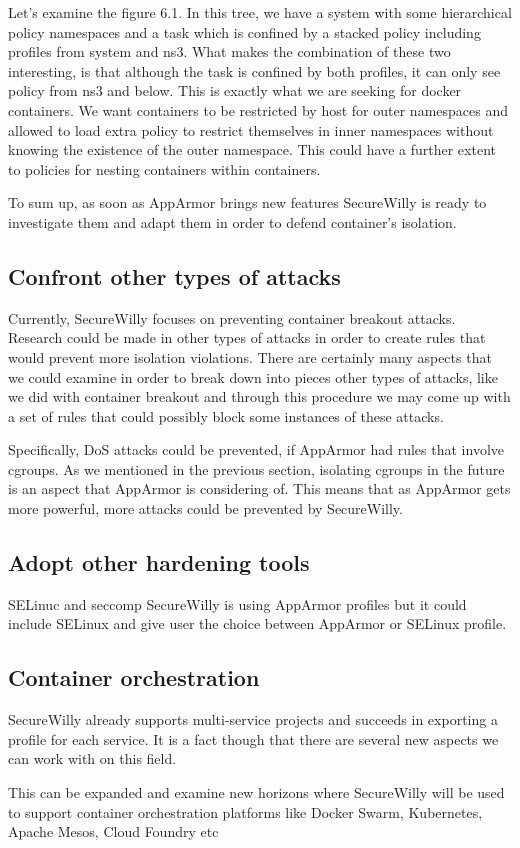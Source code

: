 Let's examine the figure 6.1. In this tree, we have a system with some hierarchical policy namespaces and a task which is confined by a stacked policy including profiles from system and ns3. What makes the combination of these two interesting, is that although the task is confined by both profiles, it can only see policy from ns3 and below. This is exactly what we are seeking for docker containers. We want containers to be restricted by host for outer namespaces and allowed to load extra policy to restrict themselves in inner namespaces without knowing the existence of the outer namespace.
This could have a further extent to policies for nesting containers within containers.

To sum up, as soon as AppArmor brings new features SecureWilly is ready to investigate them and adapt them in order to defend container's isolation.

\subsection{Confront other types of attacks}
Currently, SecureWilly focuses on preventing container breakout attacks. Research could be made in other types of attacks in order to create rules that would prevent more isolation violations. There are certainly many aspects that we could examine in order to break down into pieces other types of attacks, like we did with container breakout and through this procedure we may come up with a set of rules that could possibly block some instances of these attacks.

Specifically, DoS attacks could be prevented, if AppArmor had rules that involve cgroups. As we mentioned in the previous section, isolating cgroups in the future is an aspect that AppArmor is considering of. This means that as AppArmor gets more powerful, more attacks could be prevented by SecureWilly.

\subsection{Adopt other hardening tools}
SELinuc and seccomp
SecureWilly is using AppArmor profiles but it could include SELinux and give user the choice between AppArmor or SELinux profile.

\subsection{Container orchestration}
SecureWilly already supports multi-service projects and succeeds in exporting a profile for each service. It is a fact though that there are several new aspects we can work with on this field.

This can be expanded and examine new horizons where SecureWilly will be used to support container orchestration platforms like Docker Swarm, Kubernetes, Apache Mesos, Cloud Foundry etc 


